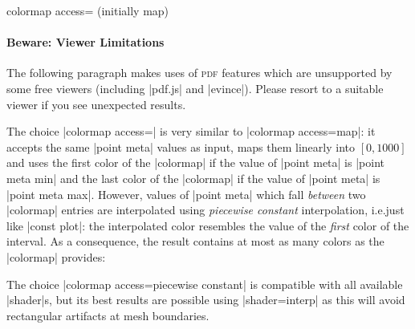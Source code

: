\begin{pgfplotskey}{colormap access= (initially map)%
}
    \paragraph{Beware: Viewer Limitations}

    The following paragraph makes uses of \textsc{pdf} features which are
    unsupported by some free viewers (including |pdf.js| and |evince|). Please
    resort to a suitable viewer if you see unexpected results.

    The choice |colormap access=| is very
    similar to |colormap access=map|: it accepts the same |point meta| values
    as input, maps them linearly into $[0,1000]$ and uses the first color of
    the |colormap| if the value of |point meta| is |point meta min| and the
    last color of the |colormap| if the value of |point meta| is
    |point meta max|. However, values of |point meta| which fall \emph{between}
    two |colormap| entries are interpolated using \emph{piecewise constant}
    interpolation, i.e.\@ just like |const plot|: the interpolated color
    resembles the value of the \emph{first} color of the interval. As a
    consequence, the result contains at most as many colors as the |colormap|
    provides:
\begin{codeexample}[]
\end{codeexample}
    The choice |colormap access=piecewise constant| is compatible with all
    available |shader|s, but its best results are possible using
    |shader=interp| as this will avoid rectangular artifacts at mesh
    boundaries.
\begin{codeexample}[]
\end{codeexample}


\end{pgfplotskey}
